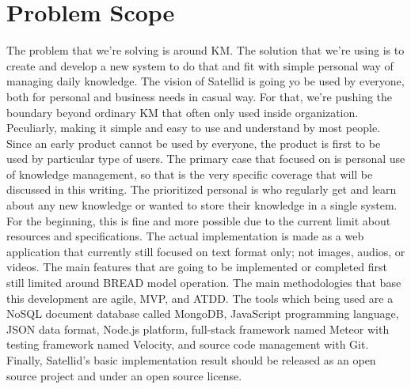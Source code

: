 \section{Problem Scope}
\label{sec:problem-scope}

The problem that we're solving is around \ac{KM}.
The solution that we're using is to create and develop a new system to do that and fit with simple personal way of managing daily knowledge.
The vision of Satellid is going yo be used by everyone, both for personal and business needs in casual way.
For that, we're pushing the boundary beyond ordinary \ac{KM} that often only used inside organization.
Peculiarly, making it simple and easy to use and understand by most people.
Since an early product cannot be used by everyone, the product is first to be used by particular type of users.
The primary case that focused on is personal use of knowledge management, so that is the very specific coverage that will be discussed in this writing.
The prioritized personal is who regularly get and learn about any new knowledge or wanted to store their knowledge in a single system.
For the beginning, this is fine and more possible due to the current limit about resources and specifications.
The actual implementation is made as a web application that currently still focused on text format only; not images, audios, or videos.
The main features that are going to be implemented or completed first still limited around \ac{BREAD} model operation.
The main methodologies that base this development are agile, \ac{MVP}, and \ac{ATDD}.
The tools which being used are a NoSQL document database called MongoDB, JavaScript programming language, JSON data format, Node.js platform, full-stack framework named Meteor with testing framework named Velocity, and source code management with Git.
Finally, Satellid's basic implementation result should be released as an open source project and under an open source license.
